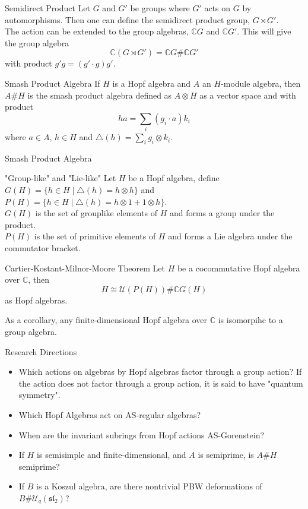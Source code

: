 \documentclass{beamer}
\begin{document}
\begin{frame}{Semidirect Product}
    Let $G$ and $G'$ be groups where $G'$ acts on $G$ by automorphisms. 
    Then one can define the semidirect product group, $G\rtimes G'$.\\
    The action can be extended to the group algebras, $\mathbb{C}G$ and $\mathbb{C}G'$.
    This will give the group algebra 
    \[
    \mathbb{C}(G\rtimes G')=\mathbb{C}G\#\mathbb{C}G'    
    \]
    with product $g'g=(g'\cdot g)g'$.\\
    \begin{block}{Smash Product Algebra}
        If $H$ is a Hopf algebra and $A$ an $H$-module algebra, then $A\#H$ is the smash product algebra defined as $A\otimes H$ as a vector space and with product
        \[
        ha=\sum_{i} (g_i\cdot a)k_i 
        \]
        where $a\in A$, $h\in H$ and $\triangle(h)=\sum_i g_i\otimes k_i$.
    \end{block}
\end{frame}

\begin{frame}{Smash Product Algebra}
    \begin{block}{"Group-like" and "Lie-like"}
        Let $H$ be a Hopf algebra, define $G(H)=\{h\in H\;\vert\; \triangle(h)=h\otimes h\}$ and $P(H)=\{h\in H\;\vert\; \triangle(h)=h\otimes 1+1\otimes h\}$.\\
        $G(H)$ is the set of grouplike elements of $H$ and forms a group under the product.\\
        $P(H)$ is the set of primitive elements of $H$ and forms a Lie algebra under the commutator bracket.
    \end{block}
    \begin{block}{Cartier-Kostant-Milnor-Moore Theorem}
        Let $H$ be a cocommutative Hopf algebra over $\mathbb{C}$, then 
        \[
            H\cong \mathcal{U}(P(H))\# \mathbb{C}G(H)
        \]
        as Hopf algebras.
    \end{block}
    As a corollary, any finite-dimensional Hopf algebra over $\mathbb{C}$ is isomorpihc to a group algebra.
\end{frame}

\begin{frame}{Research Directions}
    \begin{itemize}
    \setlength{\itemsep}{2ex}
        \item<1-> Which actions on algebras by Hopf algebras factor through a group action?
                    If the action does not factor through a group action, it is said to have "quantum symmetry".
        \item<2-> Which Hopf Algebras act on AS-regular algebras?
        \item<3-> When are the invariant subrings from Hopf actions AS-Gorenstein?
        \item<4-> If $H$ is semisimple and finite-dimensional, and $A$ is semiprime, is $A\#H$ semiprime?
        \item<5-> If $B$ is a Koszul algebra, are there nontrivial PBW deformations of $B\# \mathcal{U}_q(\mathfrak{sl_2})$?
    \end{itemize}
\end{frame}
\end{document}
